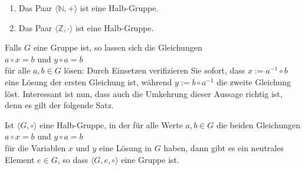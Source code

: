 \examples
\begin{enumerate}
\item Das Paar $\langle \mathbb{N}, + \rangle$ ist eine Halb-Gruppe.
\item Das Paar $\langle \mathbb{Z}, \cdot \rangle$ ist eine Halb-Gruppe.
\end{enumerate}

\noindent
Falls $G$ eine Gruppe ist, so lassen sich die Gleichungen
\\[0.2cm]
\hspace*{1.3cm}
$a \circ x = b$ \quad und \quad $y \circ a = b$
\\[0.2cm]
f\"{u}r alle $a,b \in G$ l\"{o}sen: Durch Einsetzen verifizieren Sie sofort, dass $x := a^{-1} \circ b$
eine L\"{o}sung der ersten Gleichung ist, w\"{a}hrend $y := b \circ a^{-1}$ die zweite Gleichung l\"{o}st.
Interessant ist nun, dass auch die Umkehrung dieser Aussage richtig ist, denn es gilt der folgende
Satz. 

\begin{Satz} \label{satz:solvable}
Ist $\langle G, \circ \rangle$ eine Halb-Gruppe, in der f\"{u}r alle Werte $a,b \in G$ die beiden Gleichungen 
\\[0.2cm]
\hspace*{1.3cm}
$a \circ x = b$ \quad und \quad $y \circ a = b$
\\[0.2cm]  
f\"{u}r die Variablen $x$ und $y$ eine L\"{o}sung in $G$ haben, dann
gibt es ein neutrales Element $e \in G$, so 
dass $\langle G, e, \circ \rangle$  eine Gruppe ist.
\end{Satz}

